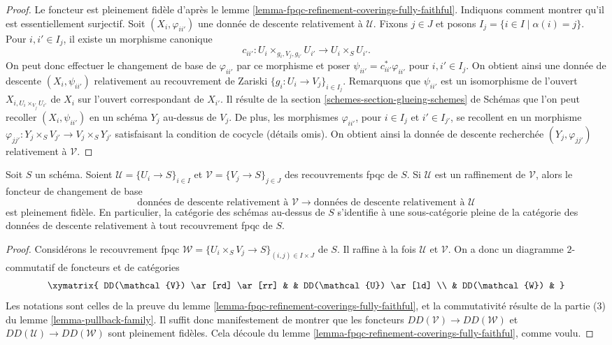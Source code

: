 \begin{proof}
Le foncteur est pleinement fidèle d'après le
lemme \ref{lemma-fpqc-refinement-coverings-fully-faithful}.
Indiquons comment montrer qu'il est essentiellement surjectif.
Soit $(X_i, \varphi_{ii'})$ une donnée de descente relativement à
$\mathcal{U}$. Fixons $j \in J$ et posons
$I_j = \{i \in I \mid \alpha(i) = j\}$. Pour $i, i' \in I_j$, il existe un
morphisme canonique
$$
c_{ii'} : U_i \times_{g_i, V_j, g_{i'}} U_{i'} \to U_i \times_S U_{i'}.
$$
On peut donc effectuer le changement de base de $\varphi_{ii'}$ par ce
morphisme et poser $\psi_{ii'} = c_{ii'}^*\varphi_{ii'}$ pour
$i, i' \in I_j$. On obtient ainsi une donnée de descente
$(X_i, \psi_{ii'})$ relativement au recouvrement de Zariski
$\{g_i : U_i \to V_j\}_{i \in I_j}$. Remarquons que $\psi_{ii'}$ est un
isomorphisme de l'ouvert $X_{i, U_i \times_{V_j} U_{i'}}$ de $X_i$ sur
l'ouvert correspondant de $X_{i'}$. Il résulte de la
section \ref{schemes-section-glueing-schemes} de Schémas que l'on peut recoller
$(X_i, \psi_{ii'})$ en un schéma $Y_j$ au-dessus de $V_j$. De plus, les
morphismes $\varphi_{ii'}$, pour $i \in I_j$ et $i' \in I_{j'}$, se
recollent en un morphisme
$\varphi_{jj'} : Y_j \times_S V_{j'} \to V_j \times_S Y_{j'}$ satisfaisant
la condition de cocycle (détails omis). On obtient ainsi la donnée de descente
recherchée $(Y_j, \varphi_{jj'})$ relativement à $\mathcal{V}$.
\end{proof}

\begin{lemma}
\label{lemma-refine-coverings-fully-faithful}
Soit $S$ un schéma. Soient
$\mathcal{U} = \{U_i \to S\}_{i \in I}$ et
$\mathcal{V} = \{V_j \to S\}_{j \in J}$ des recouvrements fpqc de $S$.
Si $\mathcal{U}$ est un raffinement de $\mathcal{V}$, alors le foncteur de
changement de base
$$
\text{données de descente relativement à }
\mathcal{V}
\longrightarrow
\text{données de descente relativement à }
\mathcal{U}
$$
est pleinement fidèle. En particulier, la catégorie des schémas au-dessus de
$S$ s'identifie à une sous-catégorie pleine de la catégorie des données de
descente relativement à tout recouvrement fpqc de $S$.
\end{lemma}

\begin{proof}
Considérons le recouvrement fpqc
$\mathcal{W} = \{U_i \times_S V_j \to S\}_{(i, j) \in I \times J}$ de $S$.
Il raffine à la fois $\mathcal{U}$ et $\mathcal{V}$. On a donc un diagramme
$2$-commutatif de foncteurs et de catégories
$$
\xymatrix{
DD(\mathcal{V}) \ar[rd] \ar[rr] & & DD(\mathcal{U}) \ar[ld] \\
& DD(\mathcal{W}) &
}
$$
Les notations sont celles de la preuve du
lemme \ref{lemma-fpqc-refinement-coverings-fully-faithful}, et la
commutativité résulte de la partie (3) du lemme \ref{lemma-pullback-family}.
Il suffit donc manifestement de montrer que les foncteurs
$DD(\mathcal{V}) \to DD(\mathcal{W})$ et
$DD(\mathcal{U}) \to DD(\mathcal{W})$ sont pleinement fidèles. Cela découle
du lemme \ref{lemma-fpqc-refinement-coverings-fully-faithful}, comme voulu.
\end{proof}

